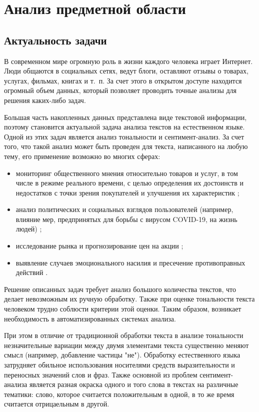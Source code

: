 \chapter{Анализ предметной области}

\section{Актуальность задачи}

В современном мире огромную роль в жизни каждого человека играет Интернет.
Люди общаются в социальных сетях, ведут блоги, оставляют отзывы о товарах,
услугах, фильмах, книгах и т.~п. За счет этого в открытом доступе находится
огромный объем данных, который позволяет проводить точные анализы для
решения каких-либо задач.  

Большая часть накопленных данных представлена виде текстовой информации, поэтому
становится актуальной задача анализа текстов на естественном языке.
\cite{article8} Одной из этих задач является анализ тональности и
сентимент-анализ.  За счет того, что такой анализ может быть проведен для
текста, написанного на любую тему, его применение возможно во многих сферах:
\begin{itemize}
    \item мониторинг общественного мнения \cite{article1} относительно товаров и
        услуг, в том числе в режиме реального времени, с целью определения их
        достоинств и недостатков с точки зрения покупателей и улучшения их
        характеристик \cite{article3};
    \item анализ политических и социальных взглядов пользователей (например,
        влияние мер, предпринятых для борьбы с вирусом COVID-19, на жизнь
        людей) \cite{article3};
    \item исследование рынка и прогнозирование цен на акции
        \cite{article3};
    \item выявление случаев эмоционального насилия и пресечение
        противоправных действий \cite{article6}.
\end{itemize}

Решение описанных задач требует анализ большого количества текстов, что
делает невозможным их ручную обработку. Также при оценке тональности текста
человеком трудно соблюсти критерии этой оценки. Таким образом, возникает
необходимость в автоматизированных системах анализа.

При этом в отличие от традиционной обработки текста в анализе тональности
незначительные вариации между двумя элементами текста существенно меняют смысл
(например, добавление частицы "не"). Обработку естественного языка затрудняет
обильное использования носителями средств выразительности и переносных значений
слов и фраз. Также основной из проблем сентимент-анализа является разная окраска
одного и того слова в текстах на различные тематики: слово, которое считается
положительным в одной, в то же время считается отрицаельным в другой.

